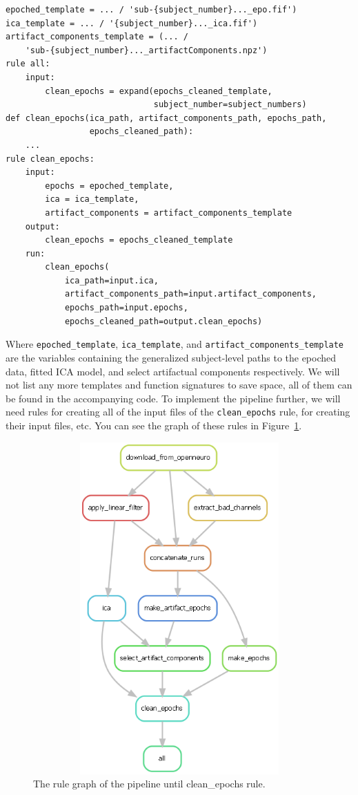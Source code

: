 \documentclass[a4paper,man,floatsintext,natbib]{apa6}
\begin{document}
\begin{verbatim}
epoched_template = ... / 'sub-{subject_number}..._epo.fif')
ica_template = ... / '{subject_number}..._ica.fif')
artifact_components_template = (... /
    'sub-{subject_number}..._artifactComponents.npz')
rule all:
    input:
        clean_epochs = expand(epochs_cleaned_template,
                              subject_number=subject_numbers)
def clean_epochs(ica_path, artifact_components_path, epochs_path,
                 epochs_cleaned_path):
    ...
rule clean_epochs:
    input:
        epochs = epoched_template,
        ica = ica_template,
        artifact_components = artifact_components_template        
    output:
        clean_epochs = epochs_cleaned_template
    run:
        clean_epochs(
            ica_path=input.ica,
            artifact_components_path=input.artifact_components,
            epochs_path=input.epochs,
            epochs_cleaned_path=output.clean_epochs)
\end{verbatim}

Where \verb|epoched_template|, \verb|ica_template|, and \verb|artifact_components_template| are the variables containing the generalized subject-level paths to the epoched data, fitted ICA model, and select artifactual components respectively. We will not list any more templates and function signatures to save space, all of them can be found in the accompanying code. To implement the pipeline further, we will need rules for creating all of the input files of the \verb|clean_epochs| rule, for creating their input files, etc. You can see the graph of these rules in Figure~\ref{fig4}.

\begin{figure}
\centering
\captionsetup{justification=centering}
\includegraphics[height=5in,width=5in,keepaspectratio]{pictures/CleanAndEpoch_rulegraph.png}
\caption{The rule graph of the pipeline until clean\_epochs rule.} \label{fig4}
\end{figure}
\end{document}
